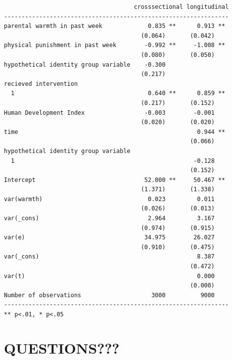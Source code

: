 \documentclass[
  letterpaper,
  DIV=11,
  numbers=noendperiod]{scrreprt}
\begin{document}
\begin{verbatim}
                                     crosssectional longitudinal
----------------------------------------------------------------
parental warmth in past week             0.835 **      0.913 ** 
                                       (0.064)       (0.042)    
physical punishment in past week        -0.992 **     -1.008 ** 
                                       (0.080)       (0.050)    
hypothetical identity group variable    -0.300                  
                                       (0.217)                  
recieved intervention                                           
  1                                      0.640 **      0.859 ** 
                                       (0.217)       (0.152)    
Human Development Index                 -0.003        -0.001    
                                       (0.020)       (0.020)    
time                                                   0.944 ** 
                                                     (0.066)    
hypothetical identity group variable                            
  1                                                   -0.128    
                                                     (0.152)    
Intercept                               52.000 **     50.467 ** 
                                       (1.371)       (1.338)    
var(warmth)                              0.023         0.011    
                                       (0.026)       (0.013)    
var(_cons)                               2.964         3.167    
                                       (0.974)       (0.915)    
var(e)                                  34.975        26.027    
                                       (0.910)       (0.475)    
var(_cons)                                             8.387    
                                                     (0.472)    
var(t)                                                 0.000    
                                                     (0.000)    
Number of observations                    3000          9000    
----------------------------------------------------------------
** p<.01, * p<.05
\end{verbatim}

\subsubsection{}

\section{QUESTIONS???}\label{majorsection}
\end{document}
